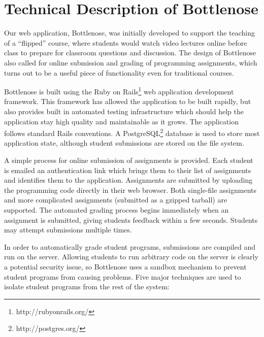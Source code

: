 \section{Technical Description of Bottlenose}

Our web application, Bottlenose, was initially developed to support
the teaching of a ``flipped'' course, where students would watch video %
lectures online before class to prepare for classroom questions and
discussion. The design of Bottlenose also called for online submission %
and grading of programming assignments, which turns out to be a useful
piece of functionality even for traditional courses.

Bottlenose is built using the Ruby on                                   %
Rails\footnote{http://rubyonrails.org/} web application development
framework. This framework has allowed the application to be built
rapidly, but also provides built in automated testing infrastructure which
should help the application stay high quality and maintainable as it     %
grows. The application follows standard Rails conventions. A
PostgreSQL\footnote{http://postgres.org/} database is used to store most
application state, although student submissions are stored on the file
system.

A simple process for online submission of assignments is
provided. Each student is emailed an authentication link which brings
them to their list of assignments and identifies them to the
application. Assignments are submitted by uploading the programming
code directly in their web browser. Both single-file assignments and
more complicated assignments (submitted as a gzipped tarball) are       %
supported. The automated grading process begins immediately when an
assignment is submitted, giving students feedback within a few
seconds.  Students may attempt submissions multiple times.

In order to automatically grade student programs, submissions are
compiled and run on the server. Allowing students to run arbitrary
code on the server is clearly a potential security issue, so
Bottlenose uses a sandbox mechanism to prevent student programs from    %
causing problems. Five major techniques are used to isolate student
programs from the rest of the system:

